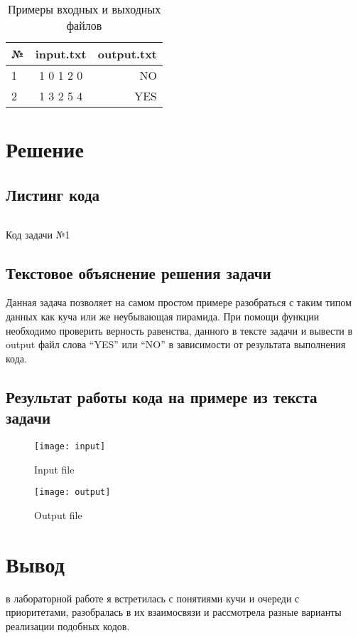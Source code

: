 \begin{table}[H]
	\caption{Примеры входных и выходных файлов}
	\begin{center}
		\begin{tabular}{|l|c|r|}
			\hline
			    № & input.txt & output.txt \\ \hline
			1 & 1 0 1 2 0 & NO \\ \hline
                2 & 1 3 2 5 4 & YES \\ \hline
		\end{tabular}
		\label{tabular:tab_examp_2}
	\end{center}
\end{table}


\newpage
\section{Решение}

\subsection{Листинг кода}
\begin{code}
	\inputminted[breaklines=true, xleftmargin=1em, linenos, frame=single, framesep=10pt, fontsize=\footnotesize, firstline=1, lastline=16]{haskell}{listings/1.py}
	\caption{Код задачи №1}
\end{code}

\subsection{Текстовое объяснение решения задачи}
Данная задача позволяет на самом простом примере разобраться с таким типом данных как куча или же неубывающая пирамида. При помощи функции необходимо проверить верность равенства, данного в тексте задачи и вывести в output файл слова “YES” или “NO” в зависимости от результата выполнения кода.


\subsection{Результат работы кода на примере из текста задачи}

\begin{figure}[H]
    \begin{center}
		\texttt{[image: input]}
		\caption{Input file}
		\label{pic:pic_name} %
  \end{center}
  \begin{center}
		\texttt{[image: output]}
		\caption{Output file}
		\label{pic:pic_name} %
  \end{center}
\end{figure}

\newpage
\section*{Вывод}
в лабораторной работе я встретилась с понятиями кучи и очереди с приоритетами, разобралась в их взаимосвязи и рассмотрела разные варианты реализации подобных кодов.
